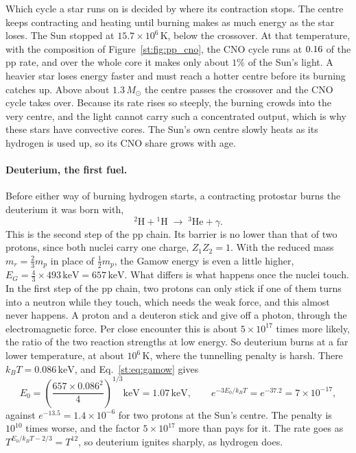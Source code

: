 Which cycle a star runs on is decided by where its contraction stops. The centre keeps contracting and heating until burning makes as much energy as the star loses. The Sun stopped at $15.7\times10^6\,\mathrm K$, below the crossover. At that temperature, with the composition of Figure~\ref{st:fig:pp_cno}, the CNO cycle runs at $0.16$ of the pp rate, and over the whole core it makes only about $1\%$ of the Sun's light. A heavier star loses energy faster and must reach a hotter centre before its burning catches up. Above about $1.3\,M_\odot$ the centre passes the crossover and the CNO cycle takes over. Because its rate rises so steeply, the burning crowds into the very centre, and the light cannot carry such a concentrated output, which is why these stars have convective cores. The Sun's own centre slowly heats as its hydrogen is used up, so its CNO share grows with age.

\paragraph{Deuterium, the first fuel.} Before either way of burning hydrogen starts, a contracting protostar burns the deuterium it was born with,
\begin{equation}
	{}^2\mathrm H+{}^1\mathrm H\;\to\;{}^3\mathrm{He}+\gamma .
	\label{st:eq:deuterium}
\end{equation}
This is the second step of the pp chain. Its barrier is no lower than that of two protons, since both nuclei carry one charge, $Z_1Z_2=1$. With the reduced mass $m_r=\tfrac23m_p$ in place of $\tfrac12m_p$, the Gamow energy is even a little higher, $E_G=\tfrac43\times493\,\mathrm{keV}=657\,\mathrm{keV}$. What differs is what happens once the nuclei touch. In the first step of the pp chain, two protons can only stick if one of them turns into a neutron while they touch, which needs the weak force, and this almost never happens. A proton and a deuteron stick and give off a photon, through the electromagnetic force. Per close encounter this is about $5\times10^{17}$ times more likely, the ratio of the two reaction strengths at low energy. So deuterium burns at a far lower temperature, at about $10^6\,\mathrm K$, where the tunnelling penalty is harsh. There $k_BT=0.086\,\mathrm{keV}$, and Eq.~\eqref{st:eq:gamow} gives
\[
E_0=\left(\frac{657\times0.086^2}{4}\right)^{1/3}\mathrm{keV}=1.07\,\mathrm{keV},\qquad e^{-3E_0/k_BT}=e^{-37.2}=7\times10^{-17},
\]
against $e^{-13.5}=1.4\times10^{-6}$ for two protons at the Sun's centre. The penalty is $10^{10}$ times worse, and the factor $5\times10^{17}$ more than pays for it. The rate goes as $T^{E_0/k_BT-2/3}=T^{12}$, so deuterium ignites sharply, as hydrogen does.

